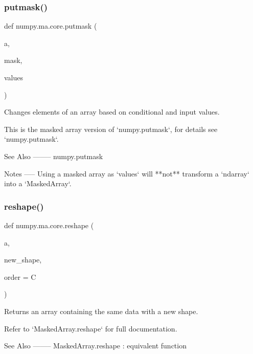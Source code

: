 \subsubsection{\texorpdfstring{putmask()}{putmask()}}
{\footnotesize\ttfamily def numpy.\+ma.\+core.\+putmask (\begin{DoxyParamCaption}\item[{}]{a,  }\item[{}]{mask,  }\item[{}]{values }\end{DoxyParamCaption})}

\begin{DoxyVerb}Changes elements of an array based on conditional and input values.

This is the masked array version of `numpy.putmask`, for details see
`numpy.putmask`.

See Also
--------
numpy.putmask

Notes
-----
Using a masked array as `values` will **not** transform a `ndarray` into
a `MaskedArray`.\end{DoxyVerb}
 \mbox{\label{namespacenumpy_1_1ma_1_1core_a2dcb6de99dd499e704550a249eaf4d6d}} 
\subsubsection{\texorpdfstring{reshape()}{reshape()}}
{\footnotesize\ttfamily def numpy.\+ma.\+core.\+reshape (\begin{DoxyParamCaption}\item[{}]{a,  }\item[{}]{new\+\_\+shape,  }\item[{}]{order = {\ttfamily \textquotesingle{}C\textquotesingle{}} }\end{DoxyParamCaption})}

\begin{DoxyVerb}Returns an array containing the same data with a new shape.

Refer to `MaskedArray.reshape` for full documentation.

See Also
--------
MaskedArray.reshape : equivalent function\end{DoxyVerb}
 \mbox{\label{namespacenumpy_1_1ma_1_1core_a174d001981edb710268b41cf5985ed1d}} 

